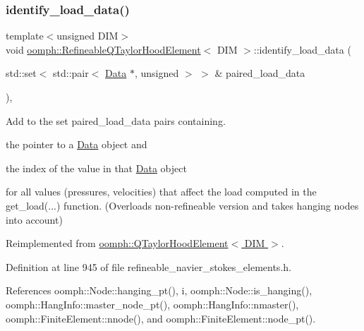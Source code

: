 \subsubsection{\texorpdfstring{identify\+\_\+load\+\_\+data()}{identify\_load\_data()}}
{\footnotesize\ttfamily template$<$unsigned D\+IM$>$ \\
void \hyperlink{classoomph_1_1RefineableQTaylorHoodElement}{oomph\+::\+Refineable\+Q\+Taylor\+Hood\+Element}$<$ D\+IM $>$\+::identify\+\_\+load\+\_\+data (\begin{DoxyParamCaption}\item[{std\+::set$<$ std\+::pair$<$ \hyperlink{classoomph_1_1Data}{Data} $\ast$, unsigned $>$ $>$ \&}]{paired\+\_\+load\+\_\+data }\end{DoxyParamCaption})\hspace{0.3cm}{\ttfamily [inline]}, {\ttfamily [virtual]}}



Add to the set {\ttfamily paired\+\_\+load\+\_\+data} pairs containing. 


\begin{DoxyItemize}
\item the pointer to a \hyperlink{classoomph_1_1Data}{Data} object and
\item the index of the value in that \hyperlink{classoomph_1_1Data}{Data} object
\end{DoxyItemize}for all values (pressures, velocities) that affect the load computed in the {\ttfamily get\+\_\+load}(...) function. (Overloads non-\/refineable version and takes hanging nodes into account) 

Reimplemented from \hyperlink{classoomph_1_1QTaylorHoodElement_af14ad75ea276ed120e620646f48dcc0c}{oomph\+::\+Q\+Taylor\+Hood\+Element$<$ D\+I\+M $>$}.



Definition at line 945 of file refineable\+\_\+navier\+\_\+stokes\+\_\+elements.\+h.



References oomph\+::\+Node\+::hanging\+\_\+pt(), i, oomph\+::\+Node\+::is\+\_\+hanging(), oomph\+::\+Hang\+Info\+::master\+\_\+node\+\_\+pt(), oomph\+::\+Hang\+Info\+::nmaster(), oomph\+::\+Finite\+Element\+::nnode(), and oomph\+::\+Finite\+Element\+::node\+\_\+pt().

\mbox{\label{classoomph_1_1RefineableQTaylorHoodElement_af6a401e81f0376d748178d8096d35835}} 
